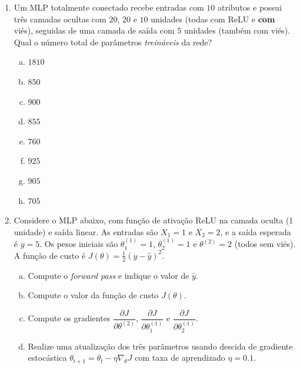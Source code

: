 \documentclass{dlproblemset}
\begin{document}
\begin{enumerate}[1)]
    \item Um MLP totalmente conectado recebe entradas com $10$ atributos e possui três camadas ocultas com $20$, $20$ e $10$ unidades (todas com ReLU e \textbf{com} viés), seguidas de uma camada de saída com $5$ unidades (também com viés). Qual o número total de parâmetros \emph{treináveis} da rede?
    \begin{enumerate}[(a)]
        \item $1810$
        \item $850$
        \item $900$
        \item $855$
        \item $760$
        \item $925$
        \item $905$
        \item $705$
    \end{enumerate}

    \item Considere o MLP abaixo, com função de ativação ReLU na camada oculta (1 unidade) e saída linear. As entradas são $X_1 = 1$ e $X_2 = 2$, e a saída esperada é $y = 5$. Os pesos iniciais são $\theta^{(1)}_1 = 1$, $\theta^{(1)}_2 = 1$ e $\theta^{(2)} = 2$ (todos sem viés). A função de custo é $J(\theta) = \tfrac{1}{2}(y - \hat{y})^2$.

    \begin{center}
    \end{center}

    \begin{enumerate}[a)]
        \item Compute o \textit{forward pass} e indique o valor de $\hat{y}$.
        \item Compute o valor da função de custo $J(\theta)$.
        \item Compute os gradientes $\dfrac{\partial J}{\partial \theta^{(2)}}$, $\dfrac{\partial J}{\partial \theta^{(1)}_1}$ e $\dfrac{\partial J}{\partial \theta^{(1)}_2}$.
        \item Realize uma atualização dos três parâmetros usando descida de gradiente estocástica $\theta_{t+1} = \theta_t - \eta \nabla_\theta J$ com taxa de aprendizado $\eta = 0.1$.
    \end{enumerate}


\end{enumerate}
\end{document}
